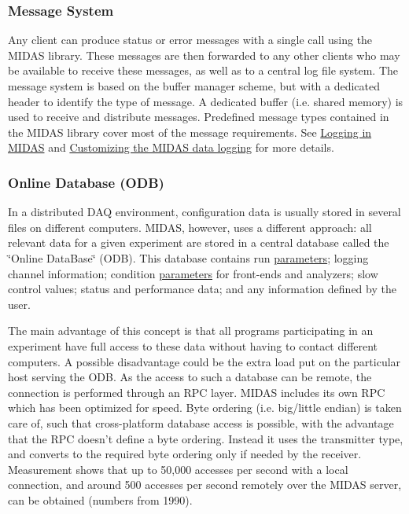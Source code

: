 \label{F_MainElements_idx_message_system-overview}
\hypertarget{F_MainElements_idx_message_system-overview}{}
 \hypertarget{F_MainElements_F_Message_System_overview}{}\subsubsection{Message System}\label{F_MainElements_F_Message_System_overview}
Any client can produce status or error messages with a single call using the MIDAS library. These messages are then forwarded to any other clients who may be available to receive these messages, as well as to a central log file system. The message system is based on the buffer manager scheme, but with a dedicated header to identify the type of message. A dedicated buffer (i.e. shared memory) is used to receive and distribute messages. Predefined message types contained in the MIDAS library cover most of the message requirements. See \hyperlink{F_Logging}{Logging in MIDAS} and \hyperlink{F_Logging_Data}{Customizing the MIDAS data logging} for more details.

\label{F_MainElements_idx_ODB_overview}
\hypertarget{F_MainElements_idx_ODB_overview}{}
 \hypertarget{F_MainElements_F_Online_Database_overview}{}\subsubsection{Online Database (ODB)}\label{F_MainElements_F_Online_Database_overview}
In a distributed DAQ environment, configuration data is usually stored in several files on different computers. MIDAS, however, uses a different approach: all relevant data for a given experiment are stored in a central database called the \char`\"{}Online DataBase\char`\"{} (ODB). This database contains run \hyperlink{structparameters}{parameters}; logging channel information; condition \hyperlink{structparameters}{parameters} for front-\/ends and analyzers; slow control values; status and performance data; and any information defined by the user.

The main advantage of this concept is that all programs participating in an experiment have full access to these data without having to contact different computers. A possible disadvantage could be the extra load put on the particular host serving the ODB. As the access to such a database can be remote, the connection is performed through an RPC layer. MIDAS includes its own RPC which has been optimized for speed. Byte ordering (i.e. big/little endian) is taken care of, such that cross-\/platform database access is possible, with the advantage that the RPC doesn't define a byte ordering. Instead it uses the transmitter type, and converts to the required byte ordering only if needed by the receiver. Measurement shows that up to 50,000 accesses per second with a local connection, and around 500 accesses per second remotely over the MIDAS server, can be obtained (numbers from 1990).

